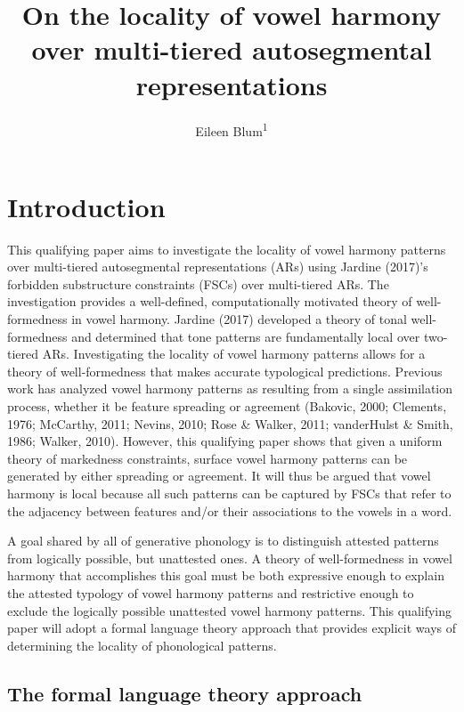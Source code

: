 \documentclass[,doc,floatsintext]{apa6}
\title{On the locality of vowel harmony over multi-tiered autosegmental
representations}
\author{Eileen Blum\textsuperscript{1}}
\date{}
\affiliation{
\vspace{0.5cm}
\textsuperscript{1} Rutgers University}
\theoremstyle{definition}
\theoremstyle{definition}
\theoremstyle{definition}
\theoremstyle{remark}
\begin{document}
\maketitle

\section{Introduction}\label{introduction}

This qualifying paper aims to investigate the locality of vowel harmony
patterns over multi-tiered autosegmental representations (ARs) using
Jardine (2017)'s forbidden substructure constraints (FSCs) over
multi-tiered ARs. The investigation provides a well-defined,
computationally motivated theory of well-formedness in vowel harmony.
Jardine (2017) developed a theory of tonal well-formedness and
determined that tone patterns are fundamentally local over two-tiered
ARs. Investigating the locality of vowel harmony patterns allows for a
theory of well-formedness that makes accurate typological predictions.
Previous work has analyzed vowel harmony patterns as resulting from a
single assimilation process, whether it be feature spreading or
agreement (Bakovic, 2000; Clements, 1976; McCarthy, 2011; Nevins, 2010;
Rose \& Walker, 2011; vanderHulst \& Smith, 1986; Walker, 2010).
However, this qualifying paper shows that given a uniform theory of
markedness constraints, surface vowel harmony patterns can be generated
by either spreading or agreement. It will thus be argued that vowel
harmony is local because all such patterns can be captured by FSCs that
refer to the adjacency between features and/or their associations to the
vowels in a word.

A goal shared by all of generative phonology is to distinguish attested
patterns from logically possible, but unattested ones. A theory of
well-formedness in vowel harmony that accomplishes this goal must be
both expressive enough to explain the attested typology of vowel harmony
patterns and restrictive enough to exclude the logically possible
unattested vowel harmony patterns. This qualifying paper will adopt a
formal language theory approach that provides explicit ways of
determining the locality of phonological patterns.

\subsection{The formal language theory
approach}\label{the-formal-language-theory-approach}
\end{document}
